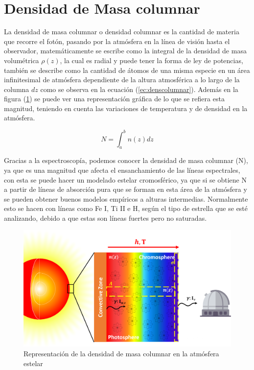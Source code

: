 \documentclass[12pt,oneside,openany,letter]{book}
\begin{document}
\section{Densidad de Masa columnar}
La densidad de masa columnar o densidad columnar es la cantidad de materia que recorre el fotón, pasando por la atmósfera en la línea de visión hasta el observador, matemáticamente se escribe como la integral de la densidad de masa volumétrica $\rho (z)$, la cual es radial y puede tener la forma de ley de potencias, %
también se describe como la cantidad de átomos de una misma especie en un área infinitesimal de atmósfera dependiente de la altura atmosférica a lo largo de la columna $dz$ como se observa en la ecuación (\ref{ec:denscolumnar}). Además en la figura (\ref{fig:rep_dens_masa}) se puede ver una representación gráfica de lo que se refiera esta magnitud, teniendo en cuenta las variaciones de temperatura y de densidad en la atmósfera.

\begin{equation}
    N = \int_a^b n (z) dz
    \label{ec:denscolumnar}
\end{equation}

\noindent Gracias a la espectroscopía, podemos conocer la densidad de masa columnar (N), ya que es una magnitud que afecta el ensanchamiento de las líneas espectrales, con esta se puede hacer un modelado estelar cromosférico, ya que si se obtiene N a partir de líneas de absorción pura que se forman en esta área de la atmósfera y se pueden obtener buenos modelos empíricos a alturas intermedias. Normalmente esto se hacen con líneas como Fe I, Ti II e H, según el tipo de estrella que se esté analizando, debido a que estas son líneas fuertes pero no saturadas. %

\begin{figure}[h]
    \centering
    \includegraphics[width=1\linewidth]{Images/densidad_masa (2).png}
    \caption{Representación de la densidad de masa columnar en la atmósfera estelar}
    \label{fig:rep_dens_masa}
\end{figure}
\end{document}
